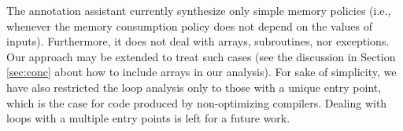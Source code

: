 
The annotation assistant currently synthesize only simple
memory policies (i.e., whenever the memory consumption policy does not depend on
the values of inputs).
Furthermore, it does not deal with arrays, subroutines, nor exceptions. Our approach may be extended to treat such cases (see the discussion in Section \ref{sec:conc} about how to include arrays in our analysis). For sake of simplicity,
we have also restricted the loop analysis only to those with a unique
entry point, which is the case for code produced by non-optimizing
compilers.
Dealing with loops with a multiple entry points is left for a future work. %

